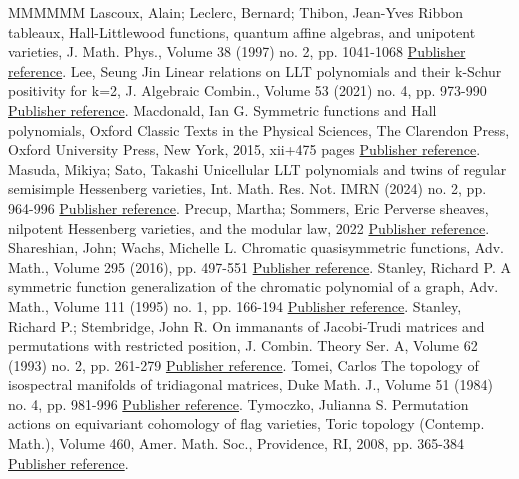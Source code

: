 \documentclass[11pt]{article}
\theoremstyle{definition}
\numberwithin{equation}{section}
\numberwithin{equation}{section}
\begin{document}
\begin{thebibliography}{MMMMMM}
 Lascoux, Alain; Leclerc, Bernard; Thibon, Jean-Yves Ribbon tableaux, Hall-Littlewood functions, quantum affine algebras, and unipotent varieties, J. Math. Phys., Volume 38 (1997) no. 2, pp. 1041-1068 \href{https://alco.centre-mersenne.org/articles/10.5802/alco.349/#LLT}{Publisher reference}.
 Lee, Seung Jin Linear relations on LLT polynomials and their k-Schur positivity for k=2, J. Algebraic Combin., Volume 53 (2021) no. 4, pp. 973-990 \href{https://alco.centre-mersenne.org/articles/10.5802/alco.349/#Lee}{Publisher reference}.
 Macdonald, Ian G. Symmetric functions and Hall polynomials, Oxford Classic Texts in the Physical Sciences, The Clarendon Press, Oxford University Press, New York, 2015, xii+475 pages \href{https://alco.centre-mersenne.org/articles/10.5802/alco.349/#Mac}{Publisher reference}.
 Masuda, Mikiya; Sato, Takashi Unicellular LLT polynomials and twins of regular semisimple Hessenberg varieties, Int. Math. Res. Not. IMRN (2024) no. 2, pp. 964-996 \href{https://alco.centre-mersenne.org/articles/10.5802/alco.349/#MS}{Publisher reference}.
 Precup, Martha; Sommers, Eric Perverse sheaves, nilpotent Hessenberg varieties, and the modular law, 2022 \href{https://alco.centre-mersenne.org/articles/10.5802/alco.349/#PS}{Publisher reference}.
 Shareshian, John; Wachs, Michelle L. Chromatic quasisymmetric functions, Adv. Math., Volume 295 (2016), pp. 497-551 \href{https://alco.centre-mersenne.org/articles/10.5802/alco.349/#SW}{Publisher reference}.
 Stanley, Richard P. A symmetric function generalization of the chromatic polynomial of a graph, Adv. Math., Volume 111 (1995) no. 1, pp. 166-194 \href{https://alco.centre-mersenne.org/articles/10.5802/alco.349/#Sta}{Publisher reference}.
 Stanley, Richard P.; Stembridge, John R. On immanants of Jacobi-Trudi matrices and permutations with restricted position, J. Combin. Theory Ser. A, Volume 62 (1993) no. 2, pp. 261-279 \href{https://alco.centre-mersenne.org/articles/10.5802/alco.349/#SS}{Publisher reference}.
 Tomei, Carlos The topology of isospectral manifolds of tridiagonal matrices, Duke Math. J., Volume 51 (1984) no. 4, pp. 981-996 \href{https://alco.centre-mersenne.org/articles/10.5802/alco.349/#Tom}{Publisher reference}.
 Tymoczko, Julianna S. Permutation actions on equivariant cohomology of flag varieties, Toric topology (Contemp. Math.), Volume 460, Amer. Math. Soc., Providence, RI, 2008, pp. 365-384 \href{https://alco.centre-mersenne.org/articles/10.5802/alco.349/#Tym}{Publisher reference}.
\end{thebibliography}
\end{document}
